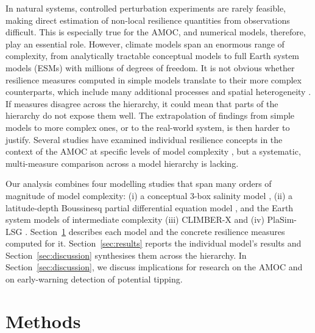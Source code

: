 \documentclass[12pt, a4paper]{article}
\begin{document}
In natural systems, controlled perturbation experiments are rarely feasible, making direct estimation of non-local resilience quantities from observations difficult. This is especially true for the AMOC, and numerical models, therefore, play an essential role. However, climate models span an enormous range of complexity, from analytically tractable conceptual models to full Earth system models (ESMs) with millions of degrees of freedom. It is not obvious whether resilience measures computed in simple models translate to their more complex counterparts, which include many additional processes and spatial heterogeneity \citep{Stouffer2006InvestigatingCausesAMOC, Schneider2017EarthSystemModeling}. If measures disagree across the hierarchy, it could mean that parts of the hierarchy do not expose them well. The extrapolation of findings from simple models to more complex ones, or to the real-world system, is then harder to justify. Several studies have examined individual resilience concepts in the context of the AMOC at specific levels of model complexity \citep{Rahmstorf2005AMOCHystersis, Cimatoribus2014AMOCBoxModel, Boers2021AMOCEWS, Ditlevsen2023AMOCPrediction, Jacques-Dumas2024RareEventResilience}, but a systematic, multi-measure comparison across a model hierarchy is lacking.

Our analysis combines four modelling studies that span many orders of magnitude of model complexity: (i) a conceptual 3-box salinity model \citep{Wood20195BoxModel, Alkhayuon2019AMOCRateTipping}, (ii) a latitude-depth Boussinesq partial differential equation model \citep{Dijkstra1997AMOCPDE, Soons2025MostLikelyNoiseinduced, Esclapez2026ConstructingEfficientScore}, and the Earth system models of intermediate complexity (iii) CLIMBER-X \citep{Willeit2022EarthSystemModel} and (iv) PlaSim-LSG \citep{Borner2026GlobalStabilityAtlantic}. Section~\ref{sec:methods} describes each model and the concrete resilience measures computed for it. Section~\ref{sec:results} reports the individual model's results and Section~\ref{sec:discussion} synthesises them across the hierarchy. In Section~\ref{sec:discussion}, we discuss implications for research on the AMOC and on early-warning detection of potential tipping.

\section{Methods}
\label{sec:methods}
\end{document}
